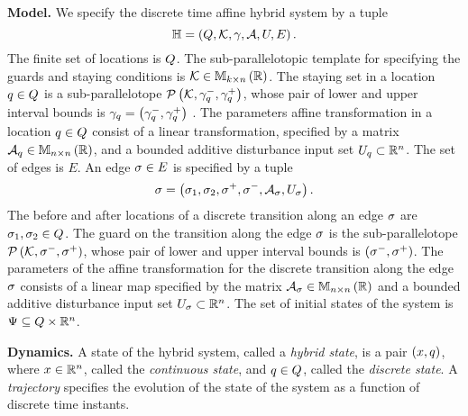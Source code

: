 {\bf Model.}  We specify the discrete time affine hybrid system
by a tuple 
\[
\mathbb{H} = \left(Q,\mathcal{K},\gamma,\mathcal{A},U,E\right).
\]
%
The finite set of locations is $Q$.  The sub-parallelotopic
template for specifying the guards and staying conditions is
$\mathcal{K}\in\mathbb{M}_{k\times n}\left(\mathbb{R}\right)$.  The staying set in a location
$q\in Q$ is a sub-parallelotope
$\mathcal{P}\left(\mathcal{K},\gamma_q^-,\gamma_q^+\right)$, whose pair of
lower and upper interval bounds is
$\gamma_q=\left(\gamma_q^-,\gamma_q^+\right)$ .  The
parameters affine transformation in a location $q\in Q$
consist of a linear transformation, specified by a matrix
$\mathcal{A}_q\in\mathbb{M}_{n\times n}\left(\mathbb{R}\right)$, and a bounded additive
disturbance input set $U_q\subset\mathbb{R}^n$.  The set of
edges is $E$.  An edge $\sigma\in E$ is specified by a tuple
%
\[
\sigma=\left(\sigma_1,\sigma_2,\sigma^+,\sigma^-,\mathcal{A}_\sigma,U_\sigma\right).
\]
%
The before and after locations of a discrete transition along an edge
$\sigma$ are $\sigma_1,\sigma_2\in Q$.  The guard on the transition along the
edge $\sigma$ is the sub-parallelotope
$\mathcal{P}\left(\mathcal{K},\sigma^-,\sigma^+\right)$, whose pair of
lower and upper interval bounds is
$\left({\sigma^-},{\sigma^+}\right)$.
The parameters of the affine transformation for the discrete
transition along the edge $\sigma$ consists of a linear map specified
by the matrix $\mathcal{A}_\sigma\in\mathbb{M}_{n\times n}\left(\mathbb{R}\right)$ and a bounded
additive disturbance input set $U_\sigma\subset\mathbb{R}^n$.  The
set of initial states of the system is $\Psi\subseteq Q\times\mathbb{R}^n$.

{\bf Dynamics.}  A state of the hybrid system, called a \emph{hybrid
  state}, is a pair $(x,q)$,
where $x\in\mathbb{R}^n$, called the {\it continuous state}, and
$q\in Q$, called the {\it discrete state}.  A {\it
  trajectory} specifies the evolution of the state of the system as a
function of discrete time instants.  

